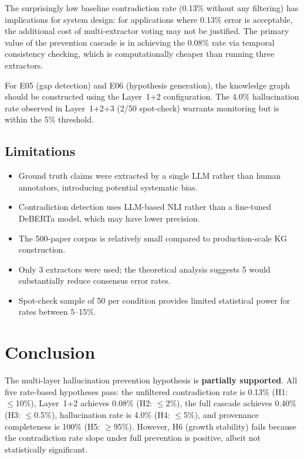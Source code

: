 \documentclass[11pt,a4paper]{article}
\begin{document}
The surprisingly low baseline contradiction rate (0.13\% without any filtering) has implications for system design: for applications where 0.13\% error is acceptable, the additional cost of multi-extractor voting may not be justified. The primary value of the prevention cascade is in achieving the 0.08\% rate via temporal consistency checking, which is computationally cheaper than running three extractors.

For E05 (gap detection) and E06 (hypothesis generation), the knowledge graph should be constructed using the Layer~1+2 configuration. The 4.0\% hallucination rate observed in Layer~1+2+3 (2/50 spot-check) warrants monitoring but is within the 5\% threshold.

\subsection{Limitations}

\begin{itemize}
    \item Ground truth claims were extracted by a single LLM rather than human annotators, introducing potential systematic bias.
    \item Contradiction detection uses LLM-based NLI rather than a fine-tuned DeBERTa model, which may have lower precision.
    \item The 500-paper corpus is relatively small compared to production-scale KG construction.
    \item Only 3 extractors were used; the theoretical analysis suggests 5 would substantially reduce consensus error rates.
    \item Spot-check sample of 50 per condition provides limited statistical power for rates between 5--15\%.
\end{itemize}

\section{Conclusion}

The multi-layer hallucination prevention hypothesis is \textbf{partially supported}. All five rate-based hypotheses pass: the unfiltered contradiction rate is 0.13\% (H1: $\leq$10\%), Layer~1+2 achieves 0.08\% (H2: $\leq$2\%), the full cascade achieves 0.40\% (H3: $\leq$0.5\%), hallucination rate is 4.0\% (H4: $\leq$5\%), and provenance completeness is 100\% (H5: $\geq$95\%). However, H6 (growth stability) fails because the contradiction rate slope under full prevention is positive, albeit not statistically significant.
\end{document}

